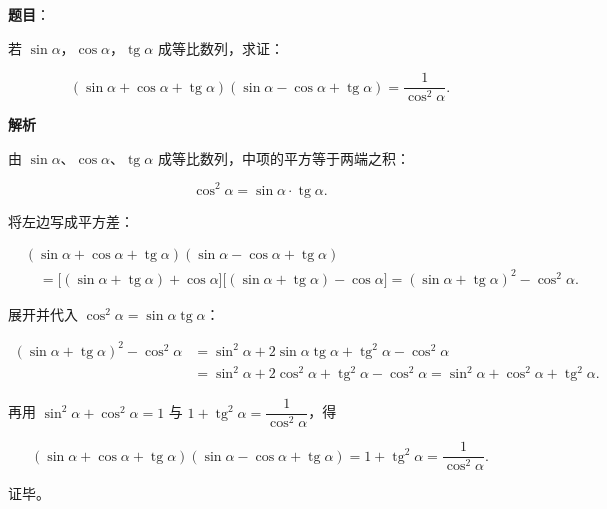 \begin{answer}

\textbf{题目}：

若 $\sin\alpha\text{，}\cos\alpha\text{，}\operatorname{tg}\alpha$ 成等比数列，求证：

\nopagebreak[4]
\[
(\sin\alpha+\cos\alpha+\operatorname{tg}\alpha)(\sin\alpha-\cos\alpha+\operatorname{tg}\alpha)=\frac1{\cos^2\alpha}.
\]

\textbf{解析}

由 $\sin\alpha\text{、}\cos\alpha\text{、}\operatorname{tg}\alpha$ 成等比数列，中项的平方等于两端之积：

\nopagebreak[4]
\[
\cos^2\alpha=\sin\alpha\cdot\operatorname{tg}\alpha.
\]

将左边写成平方差：

\nopagebreak[4]
\[
\begin{aligned}
&(\sin\alpha+\cos\alpha+\operatorname{tg}\alpha)(\sin\alpha-\cos\alpha+\operatorname{tg}\alpha)\\
&\quad=\bigl[(\sin\alpha+\operatorname{tg}\alpha)+\cos\alpha\bigr]\bigl[(\sin\alpha+\operatorname{tg}\alpha)-\cos\alpha\bigr]
=(\sin\alpha+\operatorname{tg}\alpha)^2-\cos^2\alpha.
\end{aligned}
\]

展开并代入 $\cos^2\alpha=\sin\alpha\operatorname{tg}\alpha$：

\nopagebreak[4]
\[
\begin{aligned}
(\sin\alpha+\operatorname{tg}\alpha)^2-\cos^2\alpha
&=\sin^2\alpha+2\sin\alpha\operatorname{tg}\alpha+\operatorname{tg}^2\alpha-\cos^2\alpha\\
&=\sin^2\alpha+2\cos^2\alpha+\operatorname{tg}^2\alpha-\cos^2\alpha
=\sin^2\alpha+\cos^2\alpha+\operatorname{tg}^2\alpha.
\end{aligned}
\]

再用 $\sin^2\alpha+\cos^2\alpha=1$ 与 $1+\operatorname{tg}^2\alpha=\dfrac1{\cos^2\alpha}$，得

\nopagebreak[4]
\[
(\sin\alpha+\cos\alpha+\operatorname{tg}\alpha)(\sin\alpha-\cos\alpha+\operatorname{tg}\alpha)=1+\operatorname{tg}^2\alpha=\frac1{\cos^2\alpha}.
\]

证毕。


\end{answer}
